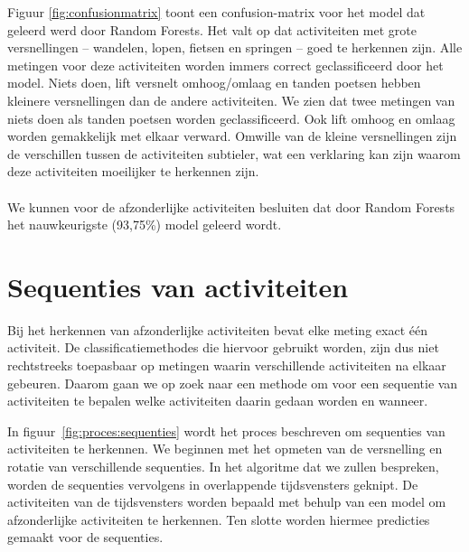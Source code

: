 \documentclass{article}
\begin{document}
Figuur \ref{fig:confusionmatrix} toont een confusion-matrix voor het model dat geleerd werd door Random Forests. Het valt op dat activiteiten met grote versnellingen -- wandelen, lopen, fietsen en springen -- goed te herkennen zijn. Alle metingen voor deze activiteiten worden immers correct geclassificeerd door het model. Niets doen, lift versnelt omhoog/omlaag en tanden poetsen hebben kleinere versnellingen dan de andere activiteiten. We zien dat twee metingen van niets doen als tanden poetsen worden geclassificeerd. Ook lift omhoog en omlaag worden gemakkelijk met elkaar verward. Omwille van de kleine versnellingen zijn de verschillen tussen de activiteiten subtieler, wat een verklaring kan zijn waarom deze activiteiten moeilijker te herkennen zijn.
\\~\\
We kunnen voor de afzonderlijke activiteiten besluiten dat door Random Forests het nauwkeurigste (93,75\%) model geleerd wordt.

\newpage
\section{Sequenties van activiteiten}

Bij het herkennen van afzonderlijke activiteiten bevat elke meting exact \'e\'en activiteit. De classificatiemethodes die hiervoor gebruikt worden, zijn dus niet rechtstreeks toepasbaar op metingen waarin verschillende activiteiten na elkaar gebeuren. Daarom gaan we op zoek naar een methode om voor een sequentie van activiteiten te bepalen welke activiteiten daarin gedaan worden en wanneer.

In figuur~\ref{fig:proces:sequenties} wordt het proces beschreven om sequenties van activiteiten te herkennen. We beginnen met het opmeten van de versnelling en rotatie van verschillende sequenties. In het algoritme dat we zullen bespreken, worden de sequenties vervolgens in overlappende tijdsvensters geknipt. De activiteiten van de tijdsvensters worden bepaald met behulp van een model om afzonderlijke activiteiten te herkennen. Ten slotte worden hiermee predicties gemaakt voor de sequenties.
\end{document}
